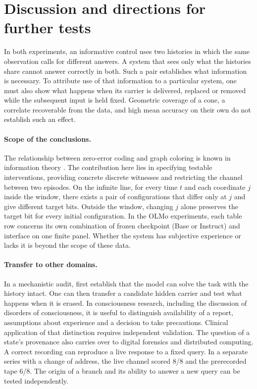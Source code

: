 \section{Discussion and directions for further tests}
In both experiments, an informative control uses two histories in which the same observation calls for different answers. A system that sees only what the histories share cannot answer correctly in both. Such a pair establishes what information is necessary. To attribute use of that information to a particular system, one must also show what happens when its carrier is delivered, replaced or removed while the subsequent input is held fixed. Geometric coverage of a cone, a correlate recoverable from the data, and high mean accuracy on their own do not establish such an effect.

\paragraph{Scope of the conclusions.}
The relationship between zero-error coding and graph coloring is known in information theory \cite{witsenhausen,charpenay}. The contribution here lies in specifying testable interventions, providing concrete discrete witnesses and restricting the channel between two episodes. On the infinite line, for every time $t$ and each coordinate $j$ inside the window, there exists a pair of configurations that differ only at $j$ and give different target bits. Outside the window, changing $j$ alone preserves the target bit for every initial configuration. In the OLMo experiments, each table row concerns its own combination of frozen checkpoint (Base or Instruct) and interface on one finite panel. Whether the system has subjective experience or lacks it is beyond the scope of these data.

\paragraph{Transfer to other domains.}
In a mechanistic audit, first establish that the model can solve the task with the history intact. One can then transfer a candidate hidden carrier and test what happens when it is erased. In consciousness research, including the discussion of disorders of consciousness, it is useful to distinguish availability of a report, assumptions about experience and a decision to take precautions. Clinical application of that distinction requires independent validation. The question of a state's provenance also carries over to digital forensics and distributed computing. A correct recording can reproduce a live response to a fixed query. In a separate series with a change of address, the live channel scored 8/8 and the prerecorded tape 6/8. The origin of a branch and its ability to answer a new query can be tested independently.

